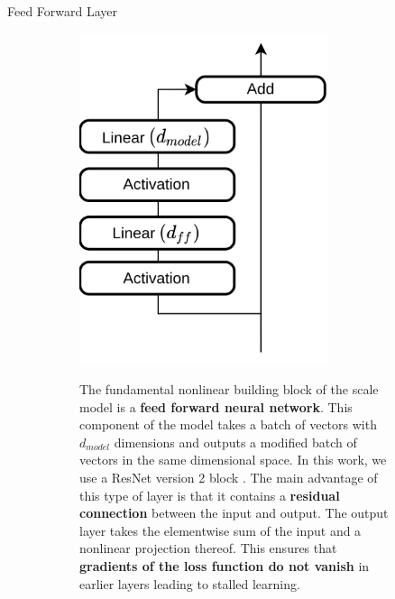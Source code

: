\documentclass[final]{beamer}
\newlength{\colwidth}
\begin{document}
\begin{frame}[t]
\begin{columns}[t]
\begin{column}{\colwidth}
  \begin{block}{Feed Forward Layer}
    \begin{figure}[t]
        \begin{subfigure}{0.3\textwidth}
            \centering
            \includegraphics[width=0.80\textwidth]{figures/model/feedfoward.png}
        \end{subfigure}
        \begin{subfigure}{0.05\textwidth}
        \end{subfigure}
        \begin{subfigure}{0.6\textwidth}
            The fundamental nonlinear building block of the scale model is a \textbf{feed forward neural network}. This component of the model takes a batch of vectors with $d_{model}$ dimensions and outputs a modified batch of vectors in the same dimensional space. In this work, we use a ResNet version 2 block \cite{he_identity_2016}. The main advantage of this type of layer is that it contains a \textbf{residual connection} between the input and output. The output layer takes the elementwise sum of the input and a nonlinear projection thereof. This ensures that \textbf{gradients of the loss function do not vanish} in earlier layers leading to stalled learning. 
        \end{subfigure}
    \end{figure}
  \end{block}


\end{column}
\end{columns}
\end{frame}
\end{document}
